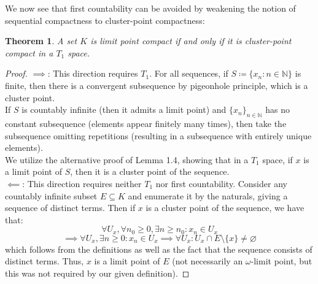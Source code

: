 \documentclass[10pt,letterpaper]{article} %
\newtheorem{thm}{Theorem}[section]
\begin{document}

We now see that first countability can be avoided by weakening the notion of sequential compactness to cluster-point compactness:
\begin{thm}
A set $K$ is limit point compact if and only if it is cluster-point compact in a $T_1$ space.
\end{thm}
\begin{proof}
$\implies$: This direction requires $T_1$. For all sequences, if $S \coloneq \{x_n : n \in \mathbb{N}\}$ is finite, then there is a convergent subsequence by pigeonhole principle, which is a cluster point.\\

If $S$ is countably infinite (then it admits a limit point) and $\{x_n\}_{n \in \mathbb{N}}$ has no constant subsequence (elements appear finitely many times), then take the subsequence omitting repetitions (resulting in a subsequence with entirely unique elements).\\

We utilize the alternative proof of Lemma 1.4, showing that in a $T_1$ space, if $x$ is a limit point of $S$, then it is a cluster point of the sequence.\\

$\impliedby$: This direction requires neither $T_1$ nor first countability. Consider any countably infinite subset $E \subseteq K$ and enumerate it by the naturals, giving a sequence of distinct terms. Then if $x$ is a cluster point of the sequence, we have that:
\begin{equation*}
\forall U_x, \forall n_0 \geqslant 0, \exists n \geqslant n_0: x_n \in U_x
\end{equation*}
\begin{equation*}
\implies \forall U_x, \exists n \geqslant 0: x_n \in U_x \implies \forall U_x: U_x \cap E \setminus \{x\} \neq \varnothing
\end{equation*}
which follows from the definitions as well as the fact that the sequence consists of distinct terms. Thus, $x$ is a limit point of $E$ (not necessarily an $\omega$-limit point, but this was not required by our given definition).
\end{proof}
\pagebreak
\end{document}
